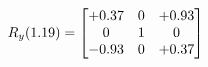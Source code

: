 \documentclass[preview]{standalone}
\begin{document}
\begin{align*}
\special{dvisvgm:raw <g id='unique000'>}R_{y}(1.19) = \begin{bmatrix}+0.37 & 0 & +0.93 \\0 & 1 & 0 \\-0.93 & 0 & +0.37\end{bmatrix}\special{dvisvgm:raw </g>}
\end{align*}
\end{document}
